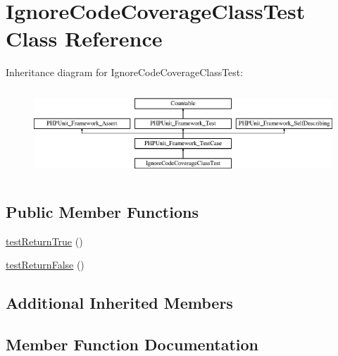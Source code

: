 \hypertarget{class_ignore_code_coverage_class_test}{}\section{Ignore\+Code\+Coverage\+Class\+Test Class Reference}
\label{class_ignore_code_coverage_class_test}
Inheritance diagram for Ignore\+Code\+Coverage\+Class\+Test\+:\begin{figure}[H]
\begin{center}
\leavevmode
\includegraphics[height=3.303835cm]{class_ignore_code_coverage_class_test}
\end{center}
\end{figure}
\subsection*{Public Member Functions}
\begin{DoxyCompactItemize}
\item 
\mbox{\hyperlink{class_ignore_code_coverage_class_test_a208671151ff42a6499040887dbd638d5}{test\+Return\+True}} ()
\item 
\mbox{\hyperlink{class_ignore_code_coverage_class_test_a09e3fc4f156b67bbe07aa6099929f4f6}{test\+Return\+False}} ()
\end{DoxyCompactItemize}
\subsection*{Additional Inherited Members}


\subsection{Member Function Documentation}
\mbox{\label{class_ignore_code_coverage_class_test_a09e3fc4f156b67bbe07aa6099929f4f6}} 
